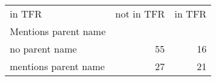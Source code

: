 \begin{tabular}{lrr}
\toprule
in TFR & not in TFR & in TFR \\
Mentions parent name &  &  \\
\midrule
no parent name & 55 & 16 \\
mentions parent name & 27 & 21 \\
\bottomrule
\end{tabular}
